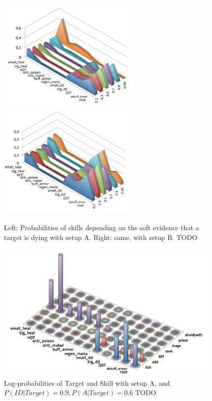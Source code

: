 \begin{figure}[h!]
\begin{center}
\includegraphics[width=7cm]{images/wow_distrib_skill1.png} \includegraphics[width=7cm]{images/wow_distrib_skill2.png}
\caption{Left: Probabilities of skills depending on the soft evidence that a target is dying with setup A. Right: same, with setup B. TODO }
\label{fig:wow_skill}
\end{center}
\end{figure}

\begin{figure}[h!]
\begin{center}
\includegraphics[width=11cm]{images/wow_distrib_target_skill.png}
\caption{Log-probabilities of Target and Skill with setup A, and $P(ID|Target)=0.9, P(A|Target)=0.6$ TODO}
\label{fig:wow_target_skill}
\end{center}
\end{figure}

